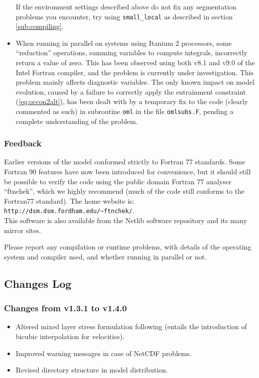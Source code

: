 \documentclass[11pt, a4paper,twoside]{article}
\numberwithin{equation}{section}
\begin{document}
\begin{itemize}
If the environment settings described above do not fix any segmentation problems you encounter, try using \verb=small_local= as described in section \ref{sub:compiling}.
\item When running in parallel on systems using Itanium 2 processors, some ``reduction'' operations, summing variables to compute integrals, incorrectly return a value of zero. 
This has been observed using both v8.1 and v9.0 of the Intel Fortran compiler, and the problem is currently under investigation. 
This problem mainly affects diagnostic variables. 
The only known impact on model evolution, caused by a failure to correctly apply the entrainment constraint (\ref{eq:occon2alt}), has been dealt with by a temporary fix to the code (clearly commented as such) in subroutine \verb=oml= in the file \verb=omlsubs.F=, pending a complete understanding of the problem.
\end{itemize}

\subsubsection{Feedback}
Earlier versions of the model conformed strictly to Fortran 77 standards.
Some Fortran 90 features have now been introduced for convenience, but it should still be possible to verify the code using the public domain Fortran 77 analyser ``ftnchek'', which we highly recommend (much of the code still conforms to the Fortran77 standard).
The home website is: \\
\verb=http://dsm.dsm.fordham.edu/~ftnchek/=.\\
This software is also available from the Netlib software repository and its many mirror sites.

Please report any compilation or runtime problems, with details of the operating system and compiler used, and whether running in parallel or not.


\subsection{Changes Log}
\subsubsection{Changes from v1.3.1 to v1.4.0}
\begin{itemize}
\item Altered mixed layer stress formulation following \cite{duhaut:06} (entails the introduction of bicubic interpolation for velocities).
\item Improved warning messages in case of NetCDF problems.
\item Revised directory structure in model distribution.
\end{itemize}
\end{document}
